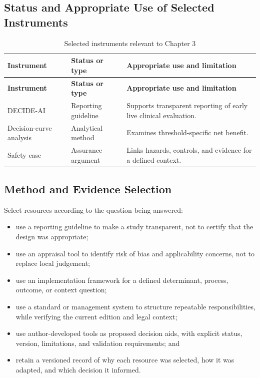 \subsection{Status and Appropriate Use of Selected Instruments}
\begin{longtable}{@{}p{}p{}p{}@{}}
\caption{Selected instruments relevant to Chapter 3}
\label{tab:comp-ch03-instrument-status}\\
\toprule
\textbf{Instrument} & \textbf{Status or type} & \textbf{Appropriate use and limitation} \\
\midrule
\endfirsthead
\toprule
\textbf{Instrument} & \textbf{Status or type} & \textbf{Appropriate use and limitation} \\
\midrule
\endhead
\bottomrule
\endlastfoot
DECIDE-AI & Reporting guideline & Supports transparent reporting of early live clinical evaluation. \\
Decision-curve analysis & Analytical method & Examines threshold-specific net benefit. \\
Safety case & Assurance argument & Links hazards, controls, and evidence for a defined context. \\
\end{longtable}

\subsection{Method and Evidence Selection}
Select resources according to the question being answered:
\begin{itemize}
 \item use a reporting guideline to make a study transparent, not to certify that the design was appropriate;
 \item use an appraisal tool to identify risk of bias and applicability concerns, not to replace local judgement;
 \item use an implementation framework for a defined determinant, process, outcome, or context question;
 \item use a standard or management system to structure repeatable responsibilities, while verifying the current edition and legal context;
 \item use author-developed tools as proposed decision aids, with explicit status, version, limitations, and validation requirements; and
 \item retain a versioned record of why each resource was selected, how it was adapted, and which decision it informed.
\end{itemize}


